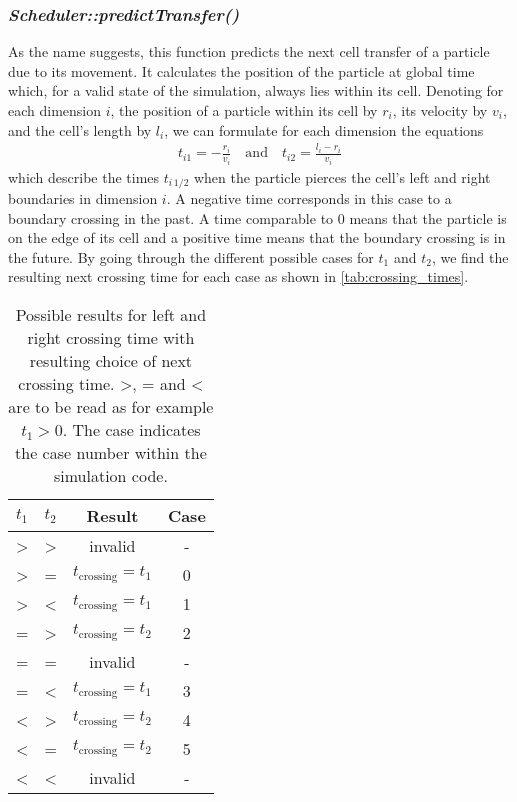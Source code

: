 \subsubsection{\quad \textit{Scheduler::predictTransfer()}}
As the name suggests, this function predicts the next cell transfer of a particle due to its movement. It calculates the position of the particle at global time which, for a valid state of the simulation, always lies within its cell. Denoting for each dimension $i$, the position of a particle within its cell by $r_i$, its velocity by $v_i$, and the cell's length by $l_i$, we can formulate for each dimension the equations
\begin{align}
t_{i1}=-\frac{r_i}{v_i} \quad \text{and} \quad t_{i2}=\frac{l_i-r_i}{v_i} 
\end{align}
which describe the times $t_{i \, 1/2}$ when the particle pierces the cell's left and right boundaries in dimension $i$. A negative time corresponds in this case to a boundary crossing in the past. A time comparable to 0 means that the particle is on the edge of its cell and a positive time means that the boundary crossing is in the future. By going through the different possible cases for $t_1$ and $t_2$, we find the resulting next crossing time for each case as shown in \autoref{tab:crossing_times}.
\begin{table}[h]
\centering
\begin{tabular}{c|c||c|c}
$t_1$ & $t_2$ & Result & Case \\ \hline
> & > & invalid & - \\ \hline
> & = & $t_{\text{crossing}} = t_1$ & 0 \\ \hline
> & < & $t_{\text{crossing}} = t_1$ & 1 \\ \hline
= & > & $t_{\text{crossing}} = t_2$ & 2\\ \hline
= & = & invalid & - \\ \hline
= & < & $t_{\text{crossing}} = t_1$ & 3 \\ \hline
< & > & $t_{\text{crossing}} = t_2$ & 4 \\ \hline
< & = & $t_{\text{crossing}} = t_2$ & 5\\ \hline
< & < & invalid & - \\ \hline
\end{tabular}
\caption[Cell boundary crossing conditions]{Possible results for left and right crossing time with resulting choice of next crossing time. >, = and < are to be read as for example $t_1 > 0$. The case indicates the case number within the simulation code.}
\label{tab:crossing_times}
\end{table}

